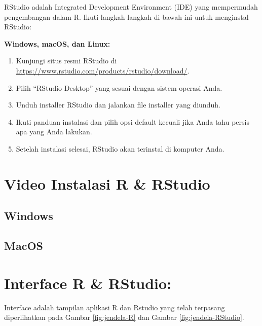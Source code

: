 \documentclass[
]{book}
\providecommand{\tightlist}{%
  \setlength{\itemsep}{0pt}\setlength{\parskip}{0pt}}
\begin{document}
RStudio adalah Integrated Development Environment (IDE) yang mempermudah pengembangan dalam R. Ikuti langkah-langkah di bawah ini untuk menginstal RStudio:

\textbf{Windows, macOS, dan Linux:}

\begin{enumerate}
\def\labelenumi{\arabic{enumi}.}
\tightlist
\item
  Kunjungi situs resmi RStudio di \url{https://www.rstudio.com/products/rstudio/download/}.
\item
  Pilih ``RStudio Desktop'' yang sesuai dengan sistem operasi Anda.
\item
  Unduh installer RStudio dan jalankan file installer yang diunduh.
\item
  Ikuti panduan instalasi dan pilih opsi default kecuali jika Anda tahu persis apa yang Anda lakukan.
\item
  Setelah instalasi selesai, RStudio akan terinstal di komputer Anda.
\end{enumerate}

\hypertarget{video-instalasi-r-rstudio}{%
\section{Video Instalasi R \& RStudio}\label{video-instalasi-r-rstudio}}

\hypertarget{windows-1}{%
\subsection{Windows}\label{windows-1}}

\hypertarget{macos-1}{%
\subsection{MacOS}\label{macos-1}}

\hypertarget{interface-r-rstudio}{%
\section{Interface R \& RStudio:}\label{interface-r-rstudio}}

Interface adalah tampilan aplikasi R dan Rstudio yang telah terpasang diperlihatkan pada Gambar \ref{fig:jendela-R} dan Gambar \ref{fig:jendela-RStudio}.
\end{document}
